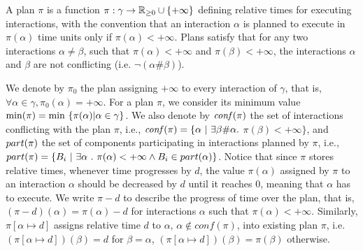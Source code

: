 \begin{definition}[Plan]\label{def:plan}
A plan $\pi$ is a function $\pi:\gamma \to\mathbb{R}_{\ge 0} \cup \{ +\infty \}$ defining relative times
for executing interactions, with the convention that an interaction $\alpha$ is planned to 
execute in $\pi(\alpha)$ time units only if $\pi(\alpha) < +\infty$.
Plans satisfy that for any two interactions $\alpha \neq \beta$, such that $\pi(\alpha) < +\infty$
and $\pi(\beta) < +\infty$, the interactions $\alpha$ and $\beta$ are not conflicting 
(i.e. $\neg(\alpha\#\beta)$).
\end{definition}
We denote by $\pi_0$ the plan assigning $+\infty$ to every interaction of $\gamma$, that is,
$\forall\alpha\in\gamma,\pi_0(\alpha)=+\infty$. For a plan $\pi$, we consider its minimum value
$\pmin=\min\ \{\pi(\alpha)|\alpha\in\gamma\}$. 
We also denote by $\mathit{conf}(\pi)$ the set of interactions conflicting with the plan $\pi$, i.e., 
$\mathit{conf}(\pi) = \{ \alpha \ | \ \exists \beta \# \alpha.$ $ \pi (\beta) < +\infty \}$, 
and $part(\pi)$ the set of components participating in interactions planned by 
$\pi$, i.e., $\p{\pi}=\{B_i\ |\ \exists\alpha\ . \ \pi(\alpha)<+\infty\wedge B_i\in\p{\alpha} \}$.
Notice that since $\pi$ stores relative times, whenever time progresses by $d$, the value 
$\pi(\alpha)$ assigned by $\pi$ to an interaction $\alpha$ should be decreased by $d$ 
until it reaches $0$, meaning that $\alpha$ has to execute.
We write $\pi-d$ to describe the progress of time 
over the plan, that is, $(\pi-d)(\alpha) = \pi(\alpha) - d$ for interactions $\alpha$ 
such that $\pi(\alpha) < +\infty$.
Similarly, $\pi [ \alpha \mapsto d ]$ assigns relative time $d$ to $\alpha$, 
$\alpha \notin conf(\pi)$, into existing plan $\pi$, i.e. $(\pi [ \alpha \mapsto d ])
(\beta) = d$ for $\beta = \alpha$, $(\pi [ \alpha \mapsto d ])(\beta) = \pi(\beta)$ 
otherwise.

